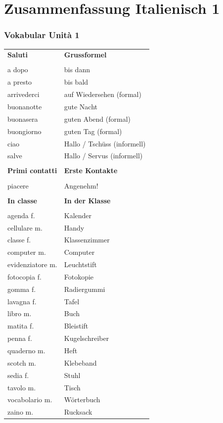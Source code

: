 \documentclass[10pt]{scrartcl}
\begin{document}
\section*{Zusammenfassung Italienisch 1}
\begin{multicols*}{2}
\let\mcnewpage=\newpage
\makeatletter
\renewcommand\newpage{%
        \if@firstcolumn
                \hrule width\linewidth height0pt
                \columnbreak
        \else
                \mcnewpage
        \fi
}
\makeatother


\subsubsection*{Vokabular Unità 1}
\begin{supertabular}{p{4cm}p{4cm}}
\textbf{Saluti} & \textbf{Grussformel} \\ 
\\
a dopo & bis dann \\  
a presto & bis bald\\
arrivederci & auf Wiedersehen (formal)\\
buonanotte & gute Nacht\\
buonasera & guten Abend (formal)\\
buongiorno & guten Tag (formal)\\
ciao & Hallo / Tschüss (informell)\\
salve & Hallo / Servus (informell)\\
\\
\textbf{Primi contatti} & \textbf{Erste Kontakte}\\
\\
piacere & Angenehm!\\
\\
\textbf{In classe} & \textbf{In der Klasse}\\
\\
agenda \hfill f. & Kalender\\
cellulare \hfill m. & Handy\\
classe \hfill f. & Klassenzimmer\\
computer \hfill m. & Computer\\
evidenziatore \hfill m. & Leuchtstift\\
fotocopia \hfill f. & Fotokopie\\
gomma \hfill f. & Radiergummi\\
lavagna \hfill f. & Tafel\\
libro \hfill m. & Buch\\
matita \hfill f. & Bleistift\\
penna \hfill f. & Kugelschreiber\\
quaderno m. \hfill & Heft\\
scotch \hfill m. & Klebeband\\
sedia \hfill f. & Stuhl\\
tavolo \hfill m. & Tisch\\
vocabolario \hfill m. & Wörterbuch\\
zaino \hfill m. & Rucksack\\
\end{supertabular}

\end{multicols*}
\end{document}

